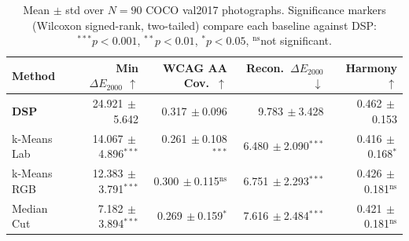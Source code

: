 \begin{table}[htbp]
\centering
\caption{Mean $\pm$ std over $N=90$ COCO val2017 photographs. Significance markers (Wilcoxon signed-rank, two-tailed) compare each baseline against DSP: $^{***}p<0.001$, $^{**}p<0.01$, $^*p<0.05$, $^{\mathrm{ns}}$not significant.}
\label{tab:aggregate_metrics}
\setlength{\tabcolsep}{5pt}
\begin{tabular}{lrrrr}
\hline\hline
Method & Min $\Delta E_{2000}$ $\uparrow$ & WCAG AA Cov.\ $\uparrow$ & Recon.\ $\Delta E_{2000}$ $\downarrow$ & Harmony $\uparrow$ \\
\hline
\textbf{DSP} & 24.921{\scriptsize$\,\pm$5.642} & 0.317{\scriptsize$\,\pm$0.096} & 9.783{\scriptsize$\,\pm$3.428} & 0.462{\scriptsize$\,\pm$0.153} \\
k-Means Lab & 14.067{\scriptsize$\,\pm$4.896}$^{\mathrm{***}}$ & 0.261{\scriptsize$\,\pm$0.108}$^{\mathrm{***}}$ & 6.480{\scriptsize$\,\pm$2.090}$^{\mathrm{***}}$ & 0.416{\scriptsize$\,\pm$0.168}$^{\mathrm{*}}$ \\
k-Means RGB & 12.383{\scriptsize$\,\pm$3.791}$^{\mathrm{***}}$ & 0.300{\scriptsize$\,\pm$0.115}$^{\mathrm{ns}}$ & 6.751{\scriptsize$\,\pm$2.293}$^{\mathrm{***}}$ & 0.426{\scriptsize$\,\pm$0.181}$^{\mathrm{ns}}$ \\
Median Cut & 7.182{\scriptsize$\,\pm$3.894}$^{\mathrm{***}}$ & 0.269{\scriptsize$\,\pm$0.159}$^{\mathrm{*}}$ & 7.616{\scriptsize$\,\pm$2.484}$^{\mathrm{***}}$ & 0.421{\scriptsize$\,\pm$0.181}$^{\mathrm{ns}}$ \\
\hline\hline
\end{tabular}
\end{table}